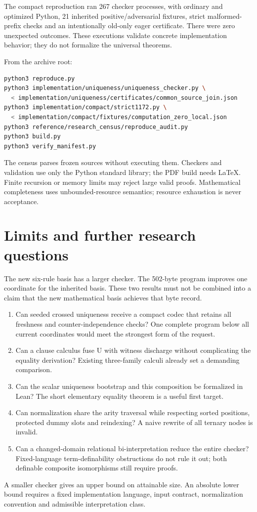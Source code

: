 The compact reproduction ran 267 checker processes, with ordinary and
optimized Python, 21 inherited positive/adversarial fixtures, strict
malformed-prefix checks and an intentionally old-only eager certificate.
There were zero unexpected outcomes. These executions validate concrete
implementation behavior; they do not formalize the universal theorems.

From the archive root:
\begin{lstlisting}[language=bash]
python3 reproduce.py
python3 implementation/uniqueness/uniqueness_checker.py \
  < implementation/uniqueness/certificates/common_source_join.json
python3 implementation/compact/strict1172.py \
  < implementation/compact/fixtures/computation_zero_local.json
python3 reference/research_census/reproduce_audit.py
python3 build.py
python3 verify_manifest.py
\end{lstlisting}
The census parses frozen sources without executing them. Checkers and
validation use only the Python standard library; the PDF build needs
LaTeX. Finite recursion or memory limits may reject large valid proofs.
Mathematical completeness uses unbounded-resource semantics; resource
exhaustion is never acceptance.

\section{Limits and further research questions}
The new six-rule basis has a larger checker. The 502-byte program improves
one coordinate for the inherited basis. These two results must not be
combined into a claim that the new mathematical basis achieves that
byte record.

\begin{enumerate}
\item Can seeded crossed uniqueness receive a compact codec that retains
all freshness and counter-independence checks? One complete program below
all current coordinates would meet the strongest form of the request.
\item Can a clause calculus fuse U with witness discharge without
complicating the equality derivation? Existing three-family calculi
already set a demanding comparison.
\item Can the scalar uniqueness bootstrap and this composition be
formalized in Lean? The short elementary equality theorem is a useful
first target.
\item Can normalization share the arity traversal while respecting
sorted positions, protected dummy slots and reindexing? A naive rewrite
of all ternary nodes is invalid.
\item Can a changed-domain relational bi-interpretation reduce the entire
checker? Fixed-language term-definability obstructions do not rule it out;
both definable composite isomorphisms still require proofs.
\end{enumerate}
A smaller checker gives an upper bound on attainable size. An absolute
lower bound requires a fixed implementation language, input contract,
normalization convention and admissible interpretation class.

